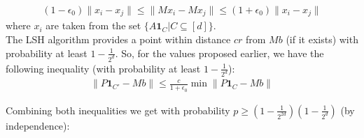 \documentclass[a4paper, 11pt]{article}
\begin{document}
\begin{align}
    (1-\epsilon_0)\lVert x_i-x_j\rVert \leq \lVert Mx_i - Mx_j\rVert \leq (1+\epsilon_0)\lVert x_i-x_j\rVert
\end{align}
where $x_i$ are taken from the set $\{A\mathbf{1}_C | C\subseteq [d]\}$.\\
The LSH algorithm provides a point within distance $cr$ from $Mb$ (if it exists) with probability at least $1-\frac{1}{2^d}$. So, for the values proposed earlier, we have the following inequality (with probability at least $1-\frac{1}{2^d}$):
\begin{align}
    \lVert P\mathbf{1}_{C'}-Mb\rVert \leq \frac{c}{1+\epsilon_0}\min \lVert P\mathbf{1}_{C}-Mb\rVert
\end{align}

Combining both inequalities we get with probability $p\geq(1-\frac{1}{2^{2d}})(1-\frac{1}{2^d})$ (by independence):
\end{document}
